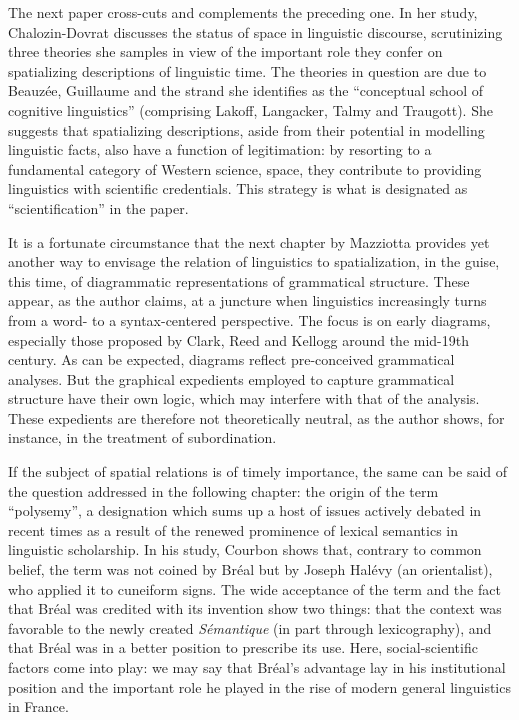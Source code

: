 \documentclass[output=paper]{langsci/langscibook}
\begin{document}
The next paper cross-cuts and complements the preceding one. In her study, Chalozin-Dovrat discusses the status of space in linguistic discourse, scrutinizing three theories she samples in view of the important role they confer on spatializing descriptions of linguistic time. The theories in question are due to Beauzée, Guillaume and the strand she identifies as the ``conceptual school of cognitive linguistics'' (comprising Lakoff, Langacker, Talmy and Traugott). She suggests that spatializing descriptions, aside from their potential in modelling linguistic facts, also have a function of legitimation: by resorting to a fundamental category of Western science, space, they contribute to providing linguistics with scientific credentials. This strategy is what is designated as ``scientification'' in the paper.

It is a fortunate circumstance that the next chapter by Mazziotta provides yet another way to envisage the relation of linguistics to spatialization, in the guise, this time, of diagrammatic representations of grammatical structure. These appear, as the author claims, at a juncture when linguistics increasingly turns from a word- to a syntax-centered perspective. The focus is on early diagrams, especially those proposed by Clark, Reed and Kellogg around the mid-19th century. As can be expected, diagrams reflect pre-conceived grammatical analyses. But the graphical expedients employed to capture grammatical structure have their own logic, which may interfere with that of the analysis. These expedients are therefore not theoretically neutral, as the author shows, for instance, in the treatment of subordination.

If the subject of spatial relations is of timely importance, the same can be said of the question addressed in the following chapter: the origin of the term ``polysemy'', a designation which sums up a host of issues actively debated in recent times as a result of the renewed prominence of lexical semantics in linguistic scholarship. In his study, Courbon shows that, contrary to common belief, the term was not coined by Bréal but by Joseph Halévy (an orientalist), who applied it to cuneiform signs. The wide acceptance of the term and the fact that Bréal was credited with its invention show two things: that the context was favorable to the newly created \emph{Sémantique} (in part through lexicography), and that Bréal was in a better position to prescribe its use. Here, social-scientific factors come into play: we may say that Bréal’s advantage lay in his institutional position and the important role he played in the rise of modern general linguistics in France.
\end{document}
